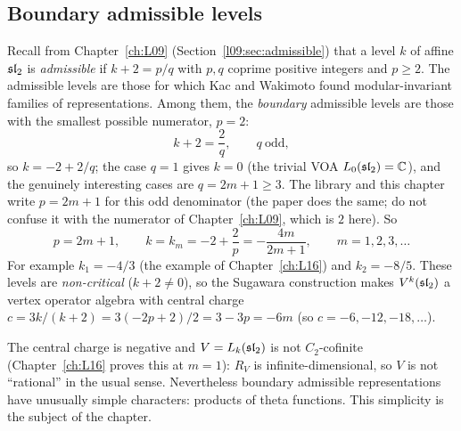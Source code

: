 \subsection{Boundary admissible levels}

Recall from Chapter~\ref{ch:L09} (Section~\ref{l09:sec:admissible}) that a level $k$ of affine $\mathfrak{sl}_2$
is \emph{admissible} if $k+2=p/q$ with $p,q$ coprime positive integers and $p\ge2$. The admissible levels
are those for which Kac and Wakimoto found modular-invariant families of representations. Among them, the
\emph{boundary} admissible levels are those with the smallest possible numerator, $p=2$:
\begin{equation*}
k+2=\frac{2}{q},\qquad q\ \text{odd},
\end{equation*}
so $k=-2+2/q$; the case $q=1$ gives $k=0$ (the trivial VOA $L_0(\mathfrak{sl}_2)={\mathbb{C}}$), and the genuinely
interesting cases are $q=2m+1\ge3$. The library and this chapter write $p=2m+1$ for this odd denominator
(the paper does the same; do not confuse it with the numerator of Chapter~\ref{ch:L09}, which is $2$ here).
So
\begin{equation*}
p=2m+1,\qquad k=k_m=-2+\frac{2}{p}=-\frac{4m}{2m+1},\qquad m=1,2,3,\dots
\end{equation*}
For example $k_1=-4/3$ (the example of Chapter~\ref{ch:L16}) and $k_2=-8/5$. These levels are
\emph{non-critical} ($k+2\neq0$), so the Sugawara construction makes $V^k(\mathfrak{sl}_2)$ a vertex operator
algebra with central charge $c=3k/(k+2)=3(-2p+2)/2=3-3p=-6m$ (so $c=-6,-12,-18,\dots$).

The central charge is negative and $V=L_k(\mathfrak{sl}_2)$ is not $C_2$-cofinite (Chapter~\ref{ch:L16}
proves this at $m=1$): $R_V$ is infinite-dimensional, so $V$ is not ``rational'' in the usual sense.
Nevertheless boundary admissible representations have unusually simple characters: products of theta
functions. This simplicity is the subject of the chapter.

